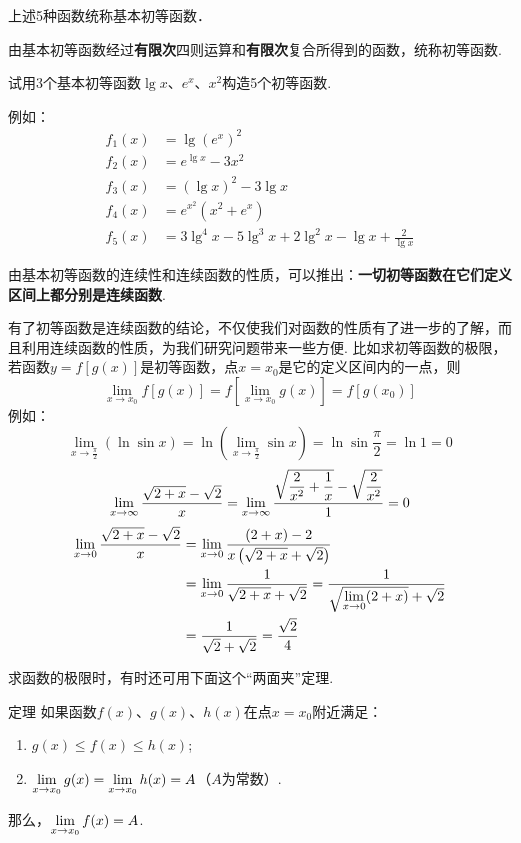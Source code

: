 上述5种函数统称基本初等函数．

由基本初等函数经过\textbf{有限次}四则运算和\textbf{有限次}复合所得到的函数，统称初等函数.

\begin{example}
    试用3个基本初等函数$\lg x$、$e^x$、$x^2$构造5个初等函数.
\end{example}

\begin{solution}
    例如：
\[\begin{split}
    f_1(x)&=\lg(e^x)^2\\
    f_2(x)&=e^{\lg x}-3x^2\\
    f_3(x)&=(\lg x)^2-3\lg x\\
    f_4(x)&=e^{x^2}(x^2+e^x)\\
    f_5(x)&=3\lg^4 x-5\lg^3x+2\lg^2x-\lg x+\frac{2}{\lg x}
\end{split}\]
\end{solution}

由基本初等函数的连续性和连续函数的性质，可以推出：\textbf{一切初等函数在它们定义区间上都分别是连续函数}.

有了初等函数是连续函数的结论，不仅使我们对函数的性质有了进一步的了解，而且利用连续函数的性质，为我们研究问题带来一些方便. 比如求初等函数的极限，若函数$y=f[g(x)]$是初等函数，点$x=x_0$是它的定义区间内的一点，则
\[\lim_{x\to x_0}f[g(x)]=f\left[\lim_{x\to x_0}g(x)\right]=f[g(x_0)]\]
例如：
\[\lim_{x\to\tfrac{\pi}{2}}(\ln \sin x)=\ln\left(\lim_{x\to\tfrac{\pi}{2}}\sin x\right)=\ln\sin\frac{\pi}{2}=\ln 1=0\]
\[\lim\limits_{x\to \infty}\dfrac{\sqrt{2+x}-\sqrt{2}}{x}=\lim\limits_{x\to \infty}\dfrac{\sqrt{\dfrac{2}{x^2}+\dfrac{1}{x}}-\sqrt{\dfrac{2}{x^2}}}{1}=0\]
\[\begin{split}
    \lim\limits_{x\to 0}\dfrac{\sqrt{2+x}-\sqrt{2}}{x}&= \lim\limits_{x\to 0}\dfrac{(2+x)-2}{x\left(\sqrt{2+x}+\sqrt{2}\right)}\\
    &= \lim\limits_{x\to 0} \dfrac{1}{\sqrt{2+x}+\sqrt{2}}=\dfrac{1}{\sqrt{ \lim\limits_{x\to 0}(2+x)}+\sqrt{2}}\\
    &=\dfrac{1}{\sqrt{2}+\sqrt{2}}=\dfrac{\sqrt{2}}{4}
\end{split}\]

求函数的极限时，有时还可用下面这个“两面夹”定理.

\begin{thm}{定理}
 如果函数$f(x)$、$g(x)$、$h(x)$在点$x=x_0$附近满足：
\begin{enumerate}[(1)]
\item $g(x)\le f(x)\le h(x)$;
\item $\lim\limits_{x\to x_0}g(x)=\lim\limits_{x\to x_0}h(x)=A$（$A$为常数）.
\end{enumerate}
那么，$\lim\limits_{x\to x_0}f(x)=A$.   
\end{thm}

